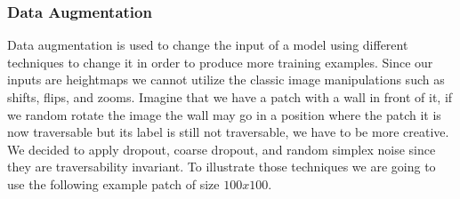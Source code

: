 \documentclass[../document.tex]{subfiles}
\begin{document}
\subsubsection{Data Augmentation}
Data augmentation is used to change the input of a model using different techniques to change it in order to produce more training examples. Since our inputs are heightmaps we cannot utilize the classic image manipulations such as shifts, flips, and zooms. Imagine that we have a patch with a wall in front of it, if we random rotate the image the wall may go in a position where the patch it is now traversable but its label is still not traversable, we have to be more creative. We decided to apply dropout, coarse dropout, and random simplex noise since they are traversability invariant. To illustrate those techniques we are going to use the following example patch of size $100x100$.
\end{document}
